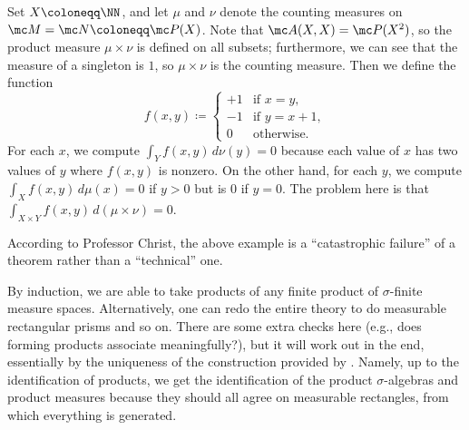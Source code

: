 \documentclass[../notes.tex]{subfiles}
\begin{document}
\begin{example}
	Set $X\coloneqq\NN$, and let $\mu$ and $\nu$ denote the counting measures on $\mc M=\mc N\coloneqq\mc P(X)$. Note that $\mc A(X,X)=\mc P(X^2)$, so the product measure $\mu\times\nu$ is defined on all subsets; furthermore, we can see that the measure of a singleton is $1$, so $\mu\times\nu$ is the counting measure. Then we define the function
	\[f(x,y)\coloneqq\begin{cases}
		+1 & \text{if }x=y, \\
		-1 & \text{if }y=x+1, \\
		0 & \text{otherwise}.
	\end{cases}\]
	For each $x$, we compute $\int_Yf(x,y)\,d\nu(y)=0$ because each value of $x$ has two values of $y$ where $f(x,y)$ is nonzero. On the other hand, for each $y$, we compute $\int_Xf(x,y)\,d\mu(x)=0$ if $y>0$ but is $0$ if $y=0$. The problem here is that $\int_{X\times Y}f(x,y)\,d(\mu\times\nu)=0$.
\end{example}
\begin{remark}
	According to Professor Christ, the above example is a ``catastrophic failure'' of a theorem rather than a ``technical'' one.
\end{remark}
\begin{remark}
	By induction, we are able to take products of any finite product of $\sigma$-finite measure spaces. Alternatively, one can redo the entire theory to do measurable rectangular prisms and so on. There are some extra checks here (e.g., does forming products associate meaningfully?), but it will work out in the end, essentially by the uniqueness of the construction provided by . Namely, up to the identification of products, we get the identification of the product $\sigma$-algebras and product measures because they should all agree on measurable rectangles, from which everything is generated.
\end{remark}
\end{document}
